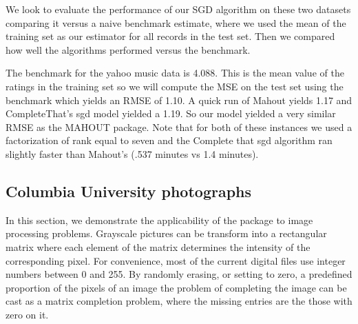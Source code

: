 \documentclass[12pt]{article}
\begin{document}
We look to evaluate the performance of our SGD algorithm on these two datasets comparing it versus a naive benchmark estimate, where we used the mean of the training set as our estimator for all records in the test set. Then we compared how well the algorithms performed versus the benchmark. 

The benchmark for the yahoo music data is 4.088. This is the mean value of the ratings in the training set so we will compute the MSE on the test set using the benchmark which yields an RMSE of 1.10. A quick run of Mahout yields 1.17 and CompleteThat's sgd model yielded a 1.19. So our model yielded a very similar RMSE as the MAHOUT package. Note that for both of these instances we used a factorization of rank equal to seven and the Complete that sgd algorithm ran slightly faster than Mahout's (.537 minutes vs 1.4 minutes). 

\begin{table}[h]
\centering
{}
\caption{RMSE vs Step Size vs Rank}
\end{table}

\clearpage
\subsection*{Columbia University photographs}
In this section, we demonstrate the applicability of the package to image processing problems. Grayscale pictures can be transform into a rectangular matrix where each element of the matrix determines the intensity of the corresponding pixel. For convenience, most of the current digital files use integer numbers between 0 and 255. By randomly erasing, or setting to zero, a predefined proportion of the pixels of an image the problem of completing the image can be cast as a matrix completion problem, where the missing entries are the those with zero on it. 
\end{document}
